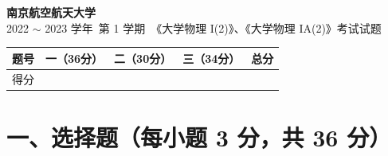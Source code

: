 \documentclass[zihao=5,a4paper,UTF8]{ctexart}
\begin{document}
\begin{center}
    {\Large\bfseries 南京航空航天大学}\\[4pt]
    {\large 2022 $\sim$ 2023 学年\ 第 1 学期\ 《大学物理 I(2)》、《大学物理 IA(2)》考试试题}
\end{center}

\begin{center}
\begin{tabular}{|c|c|c|c|c|}
\hline
题号 & 一（36分） & 二（30分） & 三（34分） & 总分 \\
\hline
得分 & \hspace{2.2cm} & \hspace{2.2cm} & \hspace{2.2cm} & \hspace{2.2cm} \\
\hline
\end{tabular}
\end{center}

\section*{一、选择题（每小题 3 分，共 36 分）}
\end{document}
